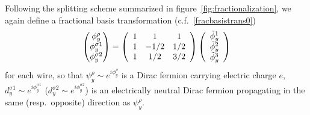 
Following the splitting scheme summarized in figure~\ref{fig:fractionalization}, we again define a fractional basis transformation (c.f.~\eqref{fracbasistrans0}) \begin{align}\begin{pmatrix}\phi^\rho_y\\\phi^{\sigma1}_y\\\phi^{\sigma2}_y\end{pmatrix}=\left(\begin{array}{*{20}c}1&1&1\\1&-1/2&1/2\\1&1/2&3/2\end{array}\right)\left(\begin{array}{*{20}c}\tilde\phi^1_y\\\tilde\phi^2_y\\\tilde\phi^3_y\end{array}\right)\label{fracbasistrans}\end{align} for each wire, so that $\psi^\rho_y\sim e^{i\phi^\rho_y}$ is a Dirac fermion carrying electric charge $e$, $d^{\sigma1}_y\sim e^{i\phi^{\sigma1}_y}$ ($d^{\sigma2}_y\sim e^{i\phi^{\sigma2}_y}$) is an electrically neutral Dirac fermion propagating in the same (resp.~opposite) direction as $\psi^\rho_y$.

